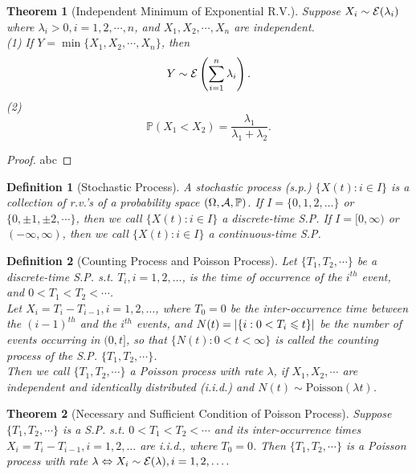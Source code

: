 \documentclass[openany,12pt]{book}
\newtheorem{theorem}{Theorem}[chapter]
\newtheorem{definition}{Definition}[chapter]
\begin{document}
\begin{theorem}[Independent Minimum of Exponential R.V.]
  Suppose $X_i\sim\mathcal{E}(\lambda_i)$ where $\lambda_i>0, i=1,2, \cdots,n$, and ${X}_1,X_2, \cdots,X_n$ are independent.\\
  (1) If $Y=\min\{X_1,X_2, \cdots,X_n\}$, then
  \[Y\sim\mathcal{E}\left( \sum_{i = 1}^{n}\lambda_{i} \right).\]
  (2)
  $$
    \mathbb{P}(X_1<X_2)=\frac{\lambda_1}{\lambda_1+\lambda_2}.
  $$
\end{theorem}

\begin{proof}
  abc
\end{proof}

\begin{definition}[Stochastic Process]
  A stochastic process (s.p.) $\{X(t):i\in I\}$ is a collection of r.v.'s of a probability space $(\Omega,\mathcal{A},\mathbb{P})$. If $I=\{0,1,2,\dots\}$ or $\{0,\pm1,\pm2,\cdots\}$, then we call $\{X(t):i\in I\}$ a discrete-time S.P. If $I=[0,\infty)$ or $(-\infty,\infty)$, then we call $\{X(t):i\in I\}$ a continuous-time S.P.
\end{definition}

\begin{definition}[Counting Process and Poisson Process]
  Let $\{T_1,T_2,\cdots\}$ be a discrete-time S.P. s.t. $T_i, i=1,2,\dots$, is the time of occurrence of the $i^{th}$ event, and $0<T_1<T_2<\cdots$.\\

  Let $X_i=T_i-T_{i-1}, i=1,2,\dots$, where $T_0=0$ be the inter-occurrence time between the ${(i-1)}^{th}$ and the $i^{th}$ events, and $N(t)=|\{i:0<T_i\leqslant t\}|$ be the number of events occurring in $(0,t]$, so that $\{N(t):0<t<\infty\}$ is called the counting process of the S.P. $\{T_1,T_2,\cdots\}$.\\

  Then we call $\{T_1,T_2,\cdots\}$ a Poisson process with rate $\lambda$, if $X_1,X_2,\cdots$ are independent and identically distributed (i.i.d.) and $N(t)\sim\mathrm{Poisson}(\lambda t)$.
\end{definition}

\begin{theorem}[Necessary and Sufficient Condition of Poisson Process]
  Suppose $\{T_1,T_2,\cdots\}$ is a S.P. s.t. $0<T_1<T_2<\cdots$ and its inter-occurrence times $X_i=T_i-T_{i-1}, i=1,2,\dots$ are i.i.d., where $T_0=0$. Then $\{T_1,T_2,\cdots\}$ is a Poisson process with rate $\lambda \Leftrightarrow X_i\sim\mathcal{E}(\lambda), i=1,2,\dots.$
\end{theorem}
\end{document}

